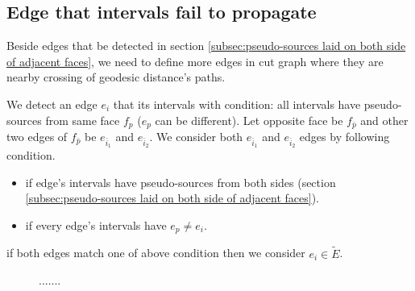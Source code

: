 \documentclass[a4paper,twoside]{article}
\begin{document}
\subsection{Edge that intervals fail to propagate}
Beside edges that be detected in section \ref{subsec:pseudo-sources laid on both side of adjacent faces},  we need to define more edges in cut graph where they are nearby crossing of geodesic distance's paths. 

We detect an edge $e_i$ that its intervals with condition: all intervals have pseudo-sources from same face $f_p$ ($e_p$ can be different). Let opposite face be $f_{\bar{p}}$ and other two edges of $f_{\bar{p}}$ be $e_{\bar{i}_1}$ and $e_{\bar{i}_2}$. We consider both $e_{\bar{i}_1}$ and $e_{\bar{i}_2}$ edges by following condition.
\begin{itemize}
	\item if edge's intervals have pseudo-sources from both sides (section \ref{subsec:pseudo-sources laid on both side of adjacent faces}).
	\item if every edge's intervals have $e_p \neq e_i$.
\end{itemize}

if both edges match one of above condition then we consider $e_i \in \tilde{E}$.

\begin{figure}[h!]
	\centering		
	\hspace{10pt}

	\caption[]{.......}
	\label{fig:fig-torus_edges_detected}
\end{figure}
\end{document}
